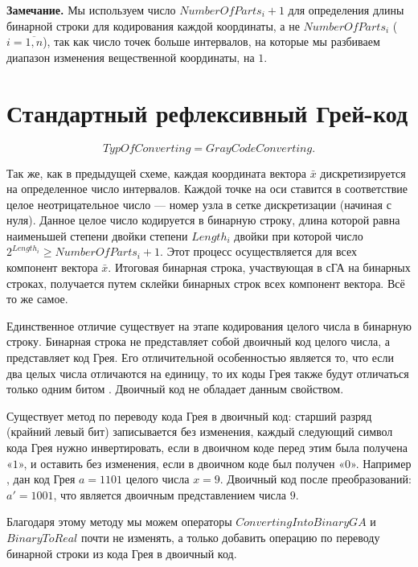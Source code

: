\textbf{Замечание.} Мы используем число $ NumberOfParts_i+1 $ для определения длины бинарной строки для кодирования каждой координаты, а не $ NumberOfParts_i $ ($i=\overline{1,n}$), так как число точек больше интервалов, на которые мы разбиваем диапазон изменения вещественной координаты, на $ 1 $.

\section{Стандартный рефлексивный Грей-код} \label{StandardGA:subsection_GrayCodeConverting}
\begin{equation}
\label{StandardGA:eq:GrayCodeConverting}
TypOfConverting =GrayCodeConverting.
\end{equation}

Так же, как в предыдущей схеме, каждая координата вектора $ \bar{x} $ дискретизируется на определенное число интервалов. Каждой точке на оси ставится в соответствие целое неотрицательное число --- номер узла в сетке дискретизации (начиная с нуля). Данное целое число кодируется в бинарную строку, длина которой равна наименьшей степени двойки степени $ Length_i $ двойки  при которой число $ 2^{Length_i}\geq NumberOfParts_i+1 $. Этот процесс осуществляется для всех компонент вектора $ \bar{x} $. Итоговая бинарная строка, участвующая в сГА на бинарных строках, получается путем склейки бинарных строк всех компонент вектора. Всё то же самое.

Единственное отличие существует на этапе кодирования целого числа в бинарную строку. Бинарная строка не представляет собой двоичный код целого числа, а представляет код Грея. Его отличительной особенностью является то, что если два целых числа отличаются на единицу, то их коды Грея также будут отличаться только одним битом \cite{web:GrayCode}. Двоичный код не обладает данным свойством.

Существует метод по переводу кода Грея в двоичный код: старший разряд (крайний левый бит) записывается без изменения, каждый следующий символ кода Грея нужно инвертировать, если в двоичном коде перед этим была получена «$ 1 $», и оставить без изменения, если в двоичном коде был получен «0». Например \cite{web:OptimalCoding}, дан код Грея $ a=1101 $ целого числа $ x=9 $. Двоичный код после преобразований: $ {a}'=1001 $, что является двоичным представлением числа $ 9 $.

Благодаря этому методу мы можем операторы $ ConvertingIntoBinaryGA $ и $ BinaryToReal $ почти не изменять, а только добавить операцию по переводу бинарной строки из кода Грея в двоичный код.

